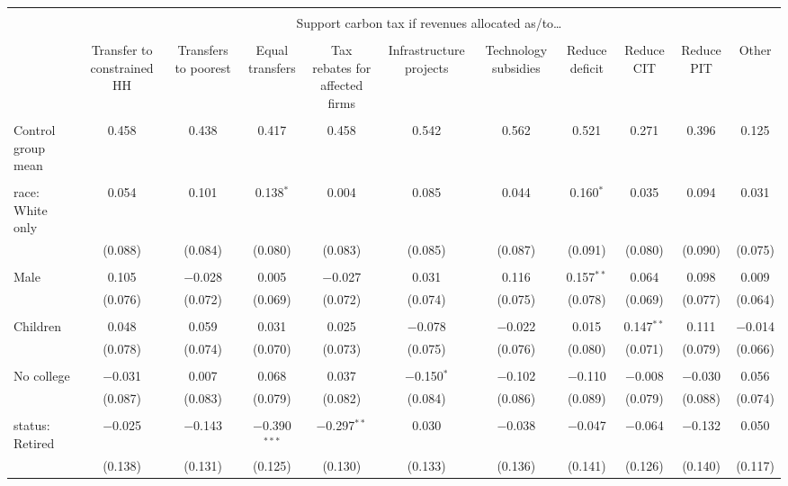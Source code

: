 
\begin{tabular}{@{\extracolsep{5pt}}lcccccccccc} 
\\[-1.8ex]\hline 
\hline \\[-1.8ex] 
 & \multicolumn{10}{c}{Support carbon tax if revenues allocated as/to…} \\ 
\cline{2-11} 
\\[-1.8ex] & Transfer to constrained HH & Transfers to poorest & Equal transfers & Tax rebates for affected firms & Infrastructure projects & Technology subsidies & Reduce deficit & Reduce CIT & Reduce PIT & Other \\ 
\hline \\[-1.8ex] 
 Control group mean & 0.458 & 0.438 & 0.417 & 0.458 & 0.542 & 0.562 & 0.521 & 0.271 & 0.396 & 0.125  \\ \hline \\[-1.8ex] race: White only & 0.054 & 0.101 & 0.138$^{*}$ & 0.004 & 0.085 & 0.044 & 0.160$^{*}$ & 0.035 & 0.094 & 0.031 \\ 
  & (0.088) & (0.084) & (0.080) & (0.083) & (0.085) & (0.087) & (0.091) & (0.080) & (0.090) & (0.075) \\ 
  & & & & & & & & & & \\ 
 Male & 0.105 & $-$0.028 & 0.005 & $-$0.027 & 0.031 & 0.116 & 0.157$^{**}$ & 0.064 & 0.098 & 0.009 \\ 
  & (0.076) & (0.072) & (0.069) & (0.072) & (0.074) & (0.075) & (0.078) & (0.069) & (0.077) & (0.064) \\ 
  & & & & & & & & & & \\ 
 Children & 0.048 & 0.059 & 0.031 & 0.025 & $-$0.078 & $-$0.022 & 0.015 & 0.147$^{**}$ & 0.111 & $-$0.014 \\ 
  & (0.078) & (0.074) & (0.070) & (0.073) & (0.075) & (0.076) & (0.080) & (0.071) & (0.079) & (0.066) \\ 
  & & & & & & & & & & \\ 
 No college & $-$0.031 & 0.007 & 0.068 & 0.037 & $-$0.150$^{*}$ & $-$0.102 & $-$0.110 & $-$0.008 & $-$0.030 & 0.056 \\ 
  & (0.087) & (0.083) & (0.079) & (0.082) & (0.084) & (0.086) & (0.089) & (0.079) & (0.088) & (0.074) \\ 
  & & & & & & & & & & \\ 
 status: Retired & $-$0.025 & $-$0.143 & $-$0.390$^{***}$ & $-$0.297$^{**}$ & 0.030 & $-$0.038 & $-$0.047 & $-$0.064 & $-$0.132 & 0.050 \\ 
  & (0.138) & (0.131) & (0.125) & (0.130) & (0.133) & (0.136) & (0.141) & (0.126) & (0.140) & (0.117) \\ 

\end{tabular}

